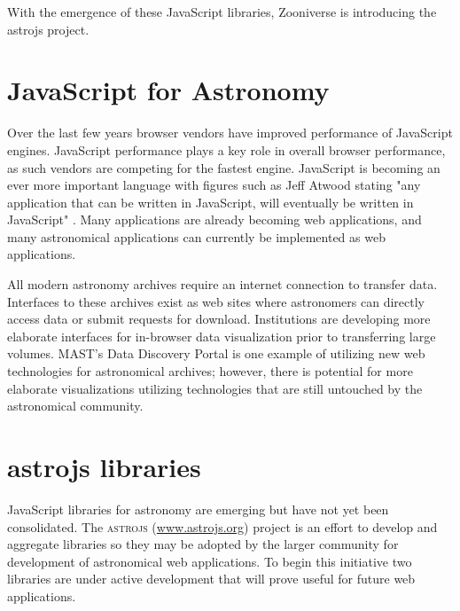 With the emergence of these JavaScript libraries, Zooniverse is introducing the astrojs project.

\section{JavaScript for Astronomy}

Over the last few years browser vendors have improved performance of JavaScript engines.  JavaScript performance plays a key role in overall browser performance, as such vendors are competing for the fastest engine.  JavaScript is becoming an ever more important language with figures such as Jeff Atwood stating "any application that can be written in JavaScript, will eventually be written in JavaScript" \citep{Atwood}.  Many applications are already becoming web applications, and many astronomical applications can currently be implemented as web applications.

All modern astronomy archives require an internet connection to transfer data.  Interfaces to these archives exist as web sites where astronomers can directly access data or submit requests for download.  Institutions are developing more elaborate interfaces for in-browser data visualization prior to transferring large volumes.  MAST's Data Discovery Portal is one example of utilizing new web technologies for astronomical archives; however, there is potential for more elaborate visualizations utilizing technologies that are still untouched by the astronomical community.

\section{astrojs libraries}

JavaScript libraries for astronomy are emerging but have not yet been consolidated.  The \textsc{astrojs} (\url{www.astrojs.org}) project is an effort to develop and aggregate libraries so they may be adopted by the larger community for development of astronomical web applications.  To begin this initiative two libraries are under active development that will prove useful for future web applications.

